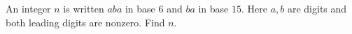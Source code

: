 An integer $n$ is written $aba$ in base $6$ and $ba$ in base $15$. Here $a,b$ are digits and both leading digits are nonzero. Find $n$.
